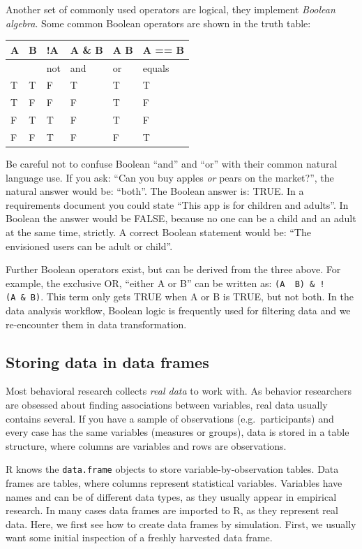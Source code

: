 \documentclass[]{svmono}
\begin{document}
Another set of commonly used operators are logical, they implement
\emph{Boolean algebra}. Some common Boolean operators are shown in the
truth table:

\begin{longtable}[]{@{}llllll@{}}
\toprule
A & B & !A & A \& B & A \textbar{} B & A == B\tabularnewline
\midrule
\endhead
& & not & and & or & equals\tabularnewline
T & T & F & T & T & T\tabularnewline
T & F & F & F & T & F\tabularnewline
F & T & T & F & T & F\tabularnewline
F & F & T & F & F & T\tabularnewline
\bottomrule
\end{longtable}

Be careful not to confuse Boolean ``and'' and ``or'' with their common
natural language use. If you ask: ``Can you buy apples \emph{or} pears
on the market?'', the natural answer would be: ``both''. The Boolean
answer is: TRUE. In a requirements document you could state ``This app
is for children and adults''. In Boolean the answer would be FALSE,
because no one can be a child and an adult at the same time, strictly. A
correct Boolean statement would be: ``The envisioned users can be adult
or child''.

Further Boolean operators exist, but can be derived from the three
above. For example, the exclusive OR, ``either A or B'' can be written
as: \texttt{(A\ \textbar{}\ B)\ \&\ !(A\ \&\ B)}. This term only gets
TRUE when A or B is TRUE, but not both. In the data analysis workflow,
Boolean logic is frequently used for filtering data and we re-encounter
them in data transformation.

\subsection{Storing data in data
frames}\label{storing-data-in-data-frames}

Most behavioral research collects \emph{real data} to work with. As
behavior researchers are obsessed about finding associations between
variables, real data usually contains several. If you have a sample of
observations (e.g.~participants) and every case has the same variables
(measures or groups), data is stored in a table structure, where columns
are variables and rows are observations.

R knows the \texttt{data.frame} objects to store variable-by-observation
tables. Data frames are tables, where columns represent statistical
variables. Variables have names and can be of different data types, as
they usually appear in empirical research. In many cases data frames are
imported to R, as they represent real data. Here, we first see how to
create data frames by simulation. First, we usually want some initial
inspection of a freshly harvested data frame.
\end{document}
